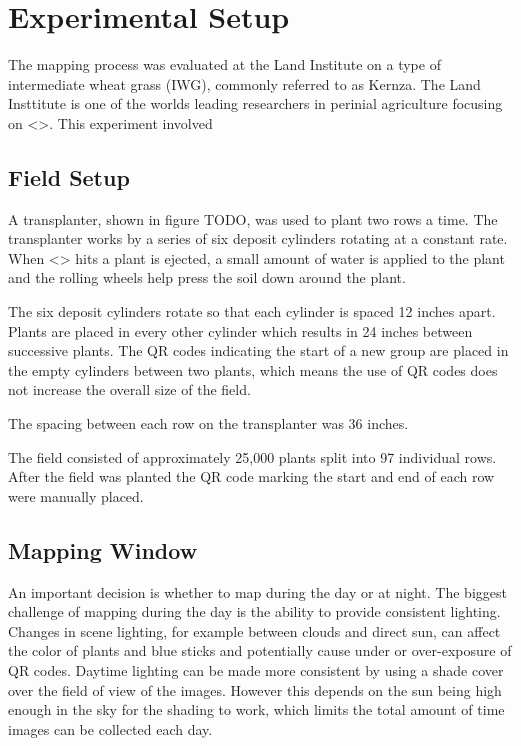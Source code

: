 
\cleardoublepage

\chapter{Experimental Setup}
\label{experiment}

The mapping process was evaluated at the Land Institute on a type of intermediate wheat grass (IWG), commonly referred to as Kernza.  The Land Insttitute is one of the worlds leading researchers in perinial agriculture focusing on <>. This experiment involved


\section{Field Setup}
\label{experiment-field}

A transplanter, shown in figure TODO, was used to plant two rows a time.  The transplanter works by a series of six deposit cylinders rotating at a constant rate.  When <> hits a plant is ejected, a small amount of water is applied to the plant and the rolling wheels help press the soil down around the plant.  

The six deposit cylinders rotate so that each cylinder is spaced 12 inches apart.  Plants are placed in every other cylinder which results in 24 inches between successive plants.  The QR codes indicating the start of a new group are placed in the empty cylinders between two plants, which means the use of QR codes does not increase the overall size of the field. 
 
The spacing between each row on the transplanter was 36 inches. 

The field consisted of approximately 25,000 plants split into 97 individual rows.  After the field was planted the QR code marking the start and end of each row were manually placed.


\section{Mapping Window}

An important decision is whether to map during the day or at night.  The biggest challenge of mapping during the day is the ability to provide consistent lighting.  Changes in scene lighting, for example between clouds and direct sun, can affect the color of plants and blue sticks and potentially cause under or over-exposure of QR codes.  Daytime lighting can be made more consistent by using a shade cover over the field of view of the images.  However this depends on the sun being high enough in the sky for the shading to work, which limits the total amount of time images can be collected each day.  

